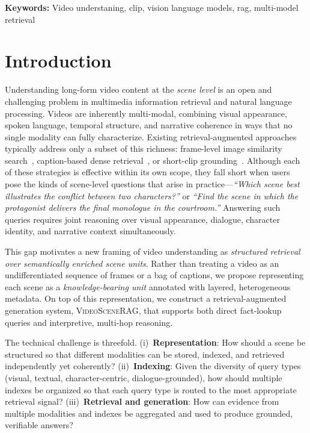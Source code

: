 \documentclass[11pt]{article}
\newcommand{\system}{\textsc{VideoSceneRAG}}
\begin{document}
\small \textbf{Keywords:} Video understaning, clip, vision language models, rag, multi-model retrieval

\section{Introduction}

Understanding long-form video content at the \emph{scene level} is an open
and challenging problem in multimedia information retrieval and natural
language processing.  Videos are inherently multi-modal, combining visual
appearance, spoken language, temporal structure, and narrative coherence in
ways that no single modality can fully characterize.  Existing
retrieval-augmented approaches typically address only a subset of this
richness: frame-level image similarity search~\cite{clip,openclip},
caption-based dense retrieval~\cite{dpr,rag}, or short-clip
grounding~\cite{vidore,videorag}.  Although each of these strategies is
effective within its own scope, they fall short when users pose the kinds of
scene-level questions that arise in practice---\emph{``Which scene best
illustrates the conflict between two characters?''} or \emph{``Find the scene
in which the protagonist delivers the final monologue in the
courtroom.''} Answering such queries requires joint reasoning over visual
appearance, dialogue, character identity, and narrative context
simultaneously.

This gap motivates a new framing of video understanding as \emph{structured
retrieval over semantically enriched scene units}.  Rather than treating a
video as an undifferentiated sequence of frames or a bag of captions, we
propose representing each scene as a \emph{knowledge-bearing unit} annotated
with layered, heterogeneous metadata.  On top of this representation, we
construct a retrieval-augmented generation system, \system, that supports
both direct fact-lookup queries and interpretive, multi-hop reasoning.

The technical challenge is threefold.  (i)~\textbf{Representation}: How
should a scene be structured so that different modalities can be stored,
indexed, and retrieved independently yet coherently?  (ii)~\textbf{Indexing}:
Given the diversity of query types (visual, textual, character-centric,
dialogue-grounded), how should multiple indexes be organized so that each
query type is routed to the most appropriate retrieval signal?
(iii)~\textbf{Retrieval and generation}: How can evidence from multiple
modalities and indexes be aggregated and used to produce grounded, verifiable
answers?
\end{document}
